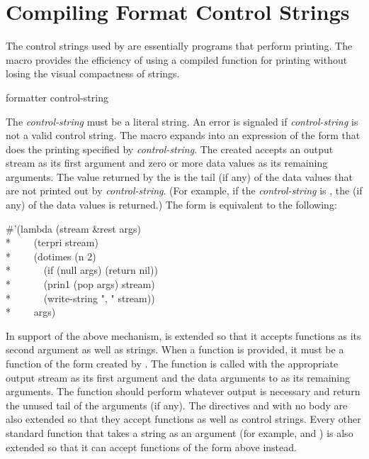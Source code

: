 \section{Compiling Format Control Strings}

The control strings used by  are essentially programs that
perform printing.  The macro  provides the efficiency of
using a compiled function for printing without losing the visual compactness of
 strings.

\begin{defmac}
formatter control-string

The {\it control-string} must be a literal string.  An error is signaled if
{\it control-string} is not a valid  control string.  The macro
 expands into an expression of the form
 that does the printing
specified by {\it control-string}.  The  created accepts an
output stream as its first argument and zero or more data values as its
remaining arguments.  The value returned by the  is the tail (if
any) of the data values that are not printed out by {\it control-string}.
(For example, if the {\it control-string} is , the
 (if any) of the data values is returned.)  The form
 is
equivalent to the following:
\begin{lisp}
\#'(lambda (stream \&rest args) \\*
~~~~(terpri stream) \\*
~~~~(dotimes (n 2) \\*
~~~~~~(if (null args) (return nil)) \\*
~~~~~~(prin1 (pop args) stream) \\*
~~~~~~(write-string ", " stream)) \\*
~~~~args)
\end{lisp}

In support of the above mechanism,  is extended so that it accepts
functions as its second argument as well as strings.  When a function is
provided, it must be a function of the form created by .  The
function is called with the appropriate output stream as its first argument
and the data arguments to  as its remaining arguments.  The
function should perform whatever output is necessary and return the unused
tail of the arguments (if any).  The directives  and
\cd{\Xtilde\{\Xtilde\}} with no body are also extended so that they accept
functions as well as control strings.  Every other standard function that
takes a  string as an argument (for example,  and )
is also extended so that it can accept functions of the form above
instead.
\end{defmac}

